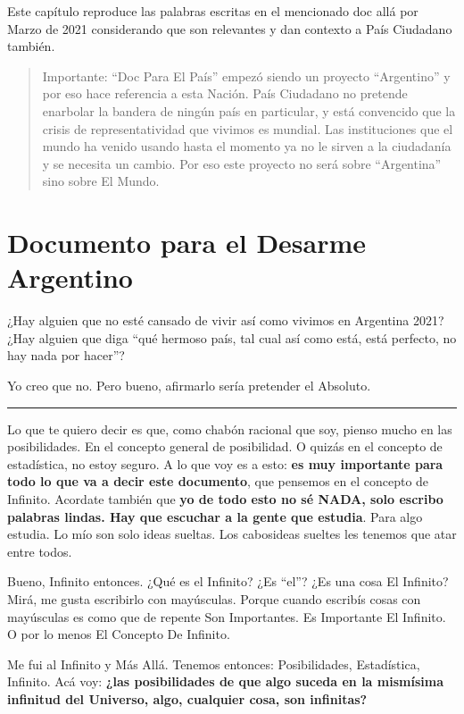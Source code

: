 \documentclass[
]{book}
\begin{document}
Este capítulo reproduce las palabras escritas en el mencionado doc allá por Marzo de 2021 considerando que son relevantes y dan contexto a País Ciudadano también.

\begin{quote}
Importante: ``Doc Para El País'' empezó siendo un proyecto ``Argentino'' y por eso hace referencia a esta Nación. País Ciudadano no pretende enarbolar la bandera de ningún país en particular, y está convencido que la crisis de representatividad que vivimos es mundial. Las instituciones que el mundo ha venido usando hasta el momento ya no le sirven a la ciudadanía y se necesita un cambio. Por eso este proyecto no será sobre ``Argentina'' sino sobre El Mundo.
\end{quote}

\hypertarget{documento-para-el-desarme-argentino}{%
\section{Documento para el Desarme Argentino}\label{documento-para-el-desarme-argentino}}

¿Hay alguien que no esté cansado de vivir así como vivimos en Argentina 2021? ¿Hay alguien que diga ``qué hermoso país, tal cual así como está, está perfecto, no hay nada por hacer''?

Yo creo que no. Pero bueno, afirmarlo sería pretender el Absoluto.

\begin{center}\rule{0.5\linewidth}{0.5pt}\end{center}

Lo que te quiero decir es que, como chabón racional que soy, pienso mucho en las posibilidades. En el concepto general de posibilidad. O quizás en el concepto de estadística, no estoy seguro. A lo que voy es a esto: \textbf{es muy importante para todo lo que va a decir este documento}, que pensemos en el concepto de Infinito. Acordate también que \textbf{yo de todo esto no sé NADA, solo escribo palabras lindas. Hay que escuchar a la gente que estudia}. Para algo estudia. Lo mío son solo ideas sueltas. Los cabosideas sueltes les tenemos que atar entre todos.

Bueno, Infinito entonces. ¿Qué es el Infinito? ¿Es ``el''? ¿Es una cosa El Infinito? Mirá, me gusta escribirlo con mayúsculas. Porque cuando escribís cosas con mayúsculas es como que de repente Son Importantes. Es Importante El Infinito. O por lo menos El Concepto De Infinito.

Me fui al Infinito y Más Allá. Tenemos entonces: Posibilidades, Estadística, Infinito. Acá voy: \textbf{¿las posibilidades de que algo suceda en la mismísima infinitud del Universo, algo, cualquier cosa, son infinitas?}
\end{document}
